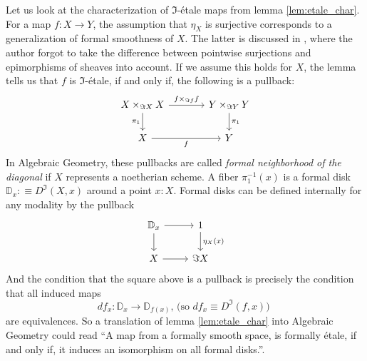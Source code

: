 \documentclass[9pt,twosided]{amsart}
\newcommand{\bD}{\mathbb D}
\begin{document}
Let us look at the characterization of $\Im$-étale maps from lemma \ref{lem:etale_char}.
For a map $f:X\to Y$, the assumption that $\eta_X$ is surjective corresponds to a generalization of formal smoothness of $X$.
The latter is discussed in \cite[Section 4.4]{wellen-thesis}, where the author forgot to take the difference between pointwise surjections and epimorphisms of sheaves into account.
If we assume this holds for $X$, the lemma tells us that $f$ is $\Im$-étale, if and only if, the following is a pullback:
\begin{equation*}
\begin{tikzcd}[column sep=large]
X\times_{\Im X} X \arrow[d,swap,"\pi_1"] \arrow[r,"{f\times_{\Im f} f}"] & Y\times_{\Im Y} Y \arrow[d,"\pi_1"] \\
X \arrow[r,swap,"f"] & Y
\end{tikzcd}
\end{equation*}
In Algebraic Geometry, these pullbacks are called \emph{formal neighborhood of the diagonal} if $X$ represents a noetherian scheme.
A fiber $\pi_1^{-1}(x)$ is a formal disk $\bD_x:\equiv D^\Im(X,x)$ around a point $x:X$.
Formal disks can be defined internally for any modality by the pullback
\begin{equation*}
  \begin{tikzcd}
    \bD_x\arrow[r]\arrow[d] & 1\arrow[d, "\eta_X(x)"] \\
    X \arrow[r] & \Im X
  \end{tikzcd}
\end{equation*}
And the condition that the square above is a pullback is precisely the condition that all induced maps
\[ df_x:\bD_x\to\bD_{f(x)}\text{, (so $df_x\equiv D^\Im(f,x)$) }\]
are equivalences. So a translation of lemma \ref{lem:etale_char} into Algebraic Geometry could read ``A map from a formally smooth space, is formally étale, if and only if, it induces an isomorphism on all formal disks.''.
\end{document}
